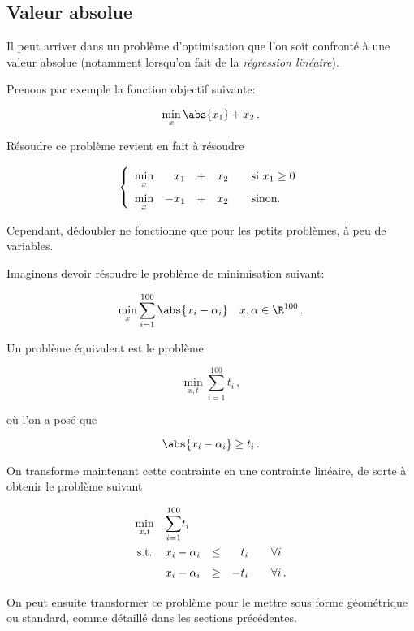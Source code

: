 \subsection{Valeur absolue}

	Il peut arriver dans un problème d'optimisation
	que l'on soit confronté à une valeur absolue
	(notamment lorsqu'on fait de la \emph{régression linéaire}).

	Prenons par exemple la fonction objectif suivante:

	\[
	\min_x \abs{x_1} + x_2\,.
	\]

	Résoudre ce problème revient en fait à résoudre

	\[
	\left\{
	\renewcommand{\arraystretch}{1.5}
	\begin{array}{c@{\quad} r c r@{\qquad} l}
		\min\limits_x & x_1 & + & x_2 & \textnormal{si } x_1 \ge 0\\
		\min\limits_x & -x_1 & + & x_2 & \textnormal{sinon.}
	\end{array}
	\right.
	\]

	Cependant, dédoubler ne fonctionne que pour les petits problèmes,
	à peu de variables.

	Imaginons devoir résoudre le problème de minimisation suivant:

	\[
	\min_x \sum_{i=1}^{100} \abs{x_i - \alpha_i} \quad x,\alpha \in \R^{100}\,.
	\]

	Un problème équivalent est le problème

	\[
	\min_{x,t} \sum_{i=1}^{100} t_i\,,
	\]

	où l'on a posé que

	\[
	\abs{x_i - \alpha_i} \ge t_i\,.
	\]

	On transforme maintenant cette contrainte en une contrainte linéaire,
	de sorte à obtenir le problème suivant

	\[
	\renewcommand{\arraystretch}{1.5}
	\begin{array}{c@{\quad} l c r@{\qquad} l}
		\min\limits_{x,t} & {\displaystyle \sum_{i=1}^{100}} t_i &&&\\
		\textnormal{s.t.} & x_i - \alpha_i & \le & t_i & \forall i\\
		& x_i - \alpha_i & \ge & -t_i & \forall i\,.\\
	\end{array}
	\]

	On peut ensuite transformer ce problème
	pour le mettre sous forme géométrique ou standard,
	comme détaillé dans les sections précédentes.


